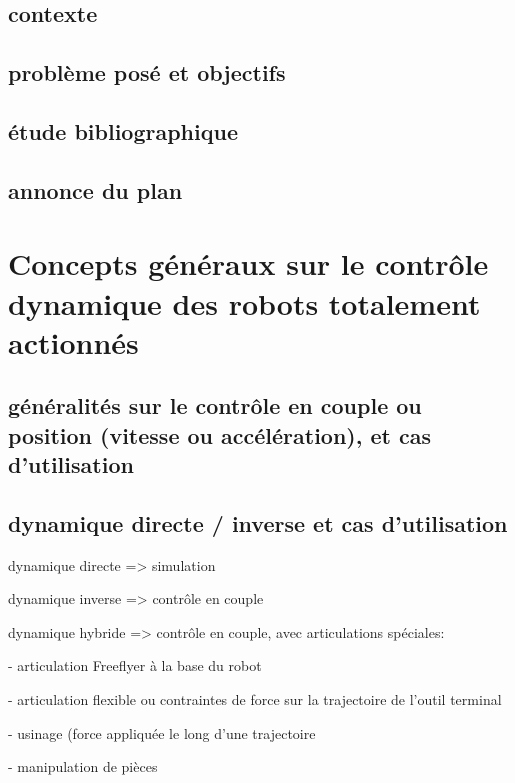 \documentclass{report}
\begin{document}
\section*{contexte}


\section*{problème posé et objectifs}


\section*{étude bibliographique}


\section*{annonce du plan}


\chapter{Concepts généraux sur le contrôle dynamique des robots totalement actionnés}

\section{généralités sur le contrôle en couple ou position (vitesse ou accélération), et cas d'utilisation}

\section{dynamique directe / inverse et cas d'utilisation}

dynamique directe => simulation
\vspace{0.3cm}

dynamique inverse => contrôle en couple
\vspace{0.3cm}

dynamique hybride => contrôle en couple, avec articulations spéciales:
\vspace{0.3cm}

	- articulation Freeflyer à la base du robot

	- articulation flexible	ou contraintes de force sur la trajectoire de l'outil terminal
	
	- usinage (force appliquée le long d'une trajectoire
	
	- manipulation de pièces
	
\end{document}
